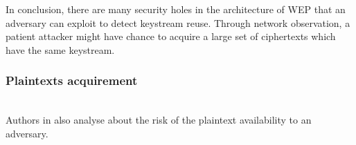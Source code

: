 In conclusion, there are many security holes in the architecture of \ac{WEP} that an adversary can exploit to detect keystream reuse. Through network observation, a patient attacker might have chance to acquire a large set of ciphertexts which have the same keystream.

\subsubsection{Plaintexts acquirement}~\\
Authors in \cite{borisov2001intercepting} also analyse about the risk of the plaintext availability to an adversary.

